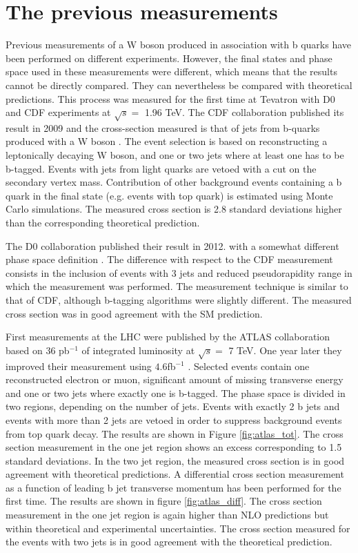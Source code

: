 \section{The previous measurements}
\label{sec:2.3}
	\par Previous measurements of a W boson produced in association with b quarks have been performed on different experiments. However, the final states and phase space used in these measurements were different, which means that the results cannot be directly compared. They can nevertheless be compared with theoretical predictions. This process was measured for the first time at Tevatron with D0 and CDF experiments at $\sqrt{s} =$ 1.96 TeV. The CDF collaboration published its result in 2009 and the cross-section measured is that of jets from b-quarks produced with a W boson \cite{Aaltonen:2009qi}. The event selection is based on reconstructing a leptonically decaying W boson, and one or two jets where at least one has to be b-tagged. Events with jets from light quarks are vetoed with a cut on the secondary vertex mass. Contribution of other background events containing a b quark in the final state (e.g. events with top quark) is estimated using Monte Carlo simulations. The measured cross section is 2.8 standard deviations higher than the corresponding theoretical prediction. 
\par The D0 collaboration published their result in 2012. with a somewhat different phase space definition \cite{D0:2012qt}. The difference with respect to the CDF measurement consists in the inclusion of events with 3 jets and reduced pseudorapidity range in which the measurement was performed. The measurement technique is similar to that of CDF, although b-tagging algorithms were slightly different. The measured cross section was in good agreement with the SM prediction.
\par	 First measurements at the LHC were published by the ATLAS collaboration based on 36 pb$^{-1}$ of integrated luminosity at $\sqrt{s} =$ 7 TeV. One year later they improved their measurement using $4.6$fb$^{-1}$ \cite{Aad:2013vka}. Selected events contain one reconstructed electron or muon, significant amount of missing transverse energy and one or two jets where exactly one is b-tagged. The phase space is divided in two regions, depending on the number of jets. Events with exactly 2 b jets and events with more than 2 jets are vetoed in order to suppress background events from top quark decay. The results are shown in Figure \ref{fig:atlas_tot}. The cross section measurement in the one jet region shows an excess corresponding to 1.5 standard deviations. In the two jet region, the measured cross section is in good agreement with theoretical predictions. A differential cross section measurement as a function of leading b jet transverse momentum has been performed for the first time. The results are shown in figure \ref{fig:atlas_diff}. The cross section measurement in the one jet region is again higher than NLO predictions but within theoretical and experimental uncertainties. The cross section measured for the events with two jets is in good agreement with the theoretical prediction.
